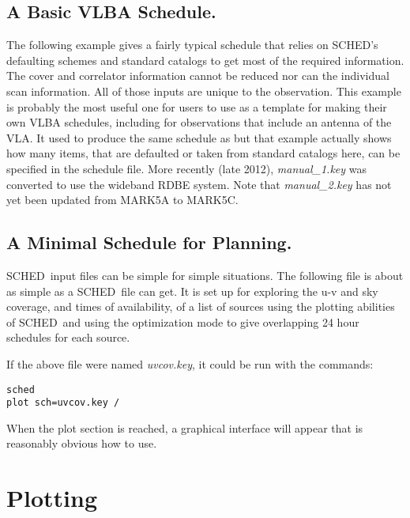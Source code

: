 \documentclass{report}
\newcommand{\sched}{{\sc SCHED}}
\newcommand{\schedb}{{\sc SCHED~}}
\begin{document}
\subsection{\label{SSEC:EXAMPLE1}A Basic VLBA Schedule.}

The following example gives a fairly typical schedule that relies on
\sched's defaulting schemes and standard catalogs to get most of the
required information.  The cover and correlator information cannot be
reduced nor can the individual scan information.  All of those inputs
are unique to the observation.  This example is probably the most
useful one for users to use as a template for making their own VLBA
schedules, including for observations that include an antenna of the
VLA.  It used to produce the same schedule as  but that example actually
shows how many items, that are defaulted or taken from standard
catalogs here, can be specified in the schedule file.  More recently
(late 2012), {\sl manual\_1.key} was converted to use the wideband
RDBE system.  Note that {\sl manual\_2.key} has not yet been updated
from MARK5A to MARK5C.




\subsection{\label{SSEC:EXAMPLE3}A Minimal Schedule for Planning.}

\schedb input files can be simple for simple situations.  The
following file is about as simple as a \schedb file can get.  It is
set up for exploring the u-v and sky coverage, and times of
availability, of a list of sources using the plotting abilities of
\schedb and using the  optimization
mode to give overlapping 24 hour schedules for each source.



If the above file were named {\sl uvcov.key}, it could be run with the
commands:
\begin{verbatim}
sched
plot sch=uvcov.key /
\end{verbatim}
When the plot section is reached, a graphical interface will appear
that is reasonably obvious how to use.



\section{\label{SEC:PLOT}Plotting}
\end{document}
